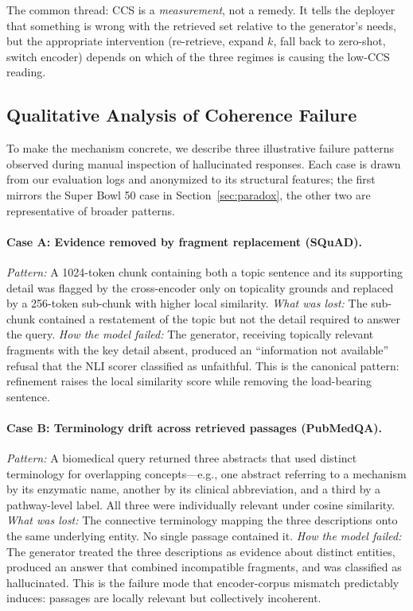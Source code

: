 The common thread: CCS is a \emph{measurement}, not a remedy. It
tells the deployer that something is wrong with the retrieved set
relative to the generator's needs, but the appropriate intervention
(re-retrieve, expand $k$, fall back to zero-shot, switch encoder)
depends on which of the three regimes is causing the low-CCS reading.

\subsection{Qualitative Analysis of Coherence Failure}
\label{sec:qualitative}

To make the mechanism concrete, we describe three illustrative failure
patterns observed during manual inspection of hallucinated responses.
Each case is drawn from our evaluation logs and anonymized to its
structural features; the first mirrors the Super Bowl 50 case in
Section~\ref{sec:paradox}, the other two are representative of broader
patterns.

\paragraph{Case A: Evidence removed by fragment replacement (SQuAD).}
\emph{Pattern:} A 1024-token chunk containing both a topic sentence and
its supporting detail was flagged by the cross-encoder only on topicality
grounds and replaced by a 256-token sub-chunk with higher local similarity.
\emph{What was lost:} The sub-chunk contained a restatement of the topic
but not the detail required to answer the query.
\emph{How the model failed:} The generator, receiving topically relevant
fragments with the key detail absent, produced an ``information not
available'' refusal that the NLI scorer classified as unfaithful. This is
the canonical pattern: refinement raises the local similarity score while
removing the load-bearing sentence.

\paragraph{Case B: Terminology drift across retrieved passages (PubMedQA).}
\emph{Pattern:} A biomedical query returned three abstracts that used
distinct terminology for overlapping concepts---e.g., one abstract
referring to a mechanism by its enzymatic name, another by its clinical
abbreviation, and a third by a pathway-level label. All three were
individually relevant under cosine similarity.
\emph{What was lost:} The connective terminology mapping the three
descriptions onto the same underlying entity. No single passage contained
it.
\emph{How the model failed:} The generator treated the three descriptions
as evidence about distinct entities, produced an answer that combined
incompatible fragments, and was classified as hallucinated. This is the
failure mode that encoder-corpus mismatch predictably induces: passages
are locally relevant but collectively incoherent.

